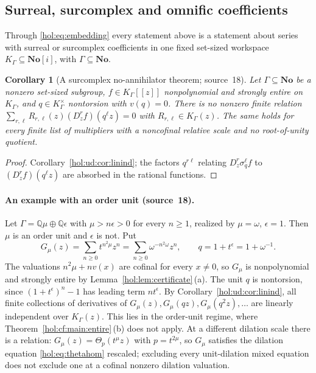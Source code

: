 \documentclass[11pt]{article}
\numberwithin{equation}{section}
\newtheorem{corollary}[theorem]{Corollary}
\theoremstyle{definition}
\theoremstyle{remark}
\newcommand{\Q}{\mathbb Q}
\newcommand{\No}{\mathbf{No}}
\begin{document}
\subsection{Surreal, surcomplex and omnific coefficients}
\label{hol:ud:sub:surreal}

Through \eqref{hol:eq:embedding} every statement above is a statement about
series with surreal or surcomplex coefficients in one fixed set-sized
workspace $K_\Gamma\subseteq\No[i]$, with $\Gamma\subseteq\No$.

\begin{corollary}[A surcomplex no-annihilator theorem; source~18]
\label{hol:ud:cor:surcomplex}
Let $\Gamma\subseteq\No$ be a nonzero set-sized subgroup, $f\in K_\Gamma[[z]]$
nonpolynomial and strongly entire on $K_\Gamma$, and $q\in K_\Gamma^\times$
nontorsion with $v(q)=0$. There is no nonzero finite relation
$\sum_{r,\ell}R_{r,\ell}(z)(D_z^rf)(q^\ell z)=0$ with
$R_{r,\ell}\in K_\Gamma(z)$. The same holds for every finite list of
multipliers with a noncofinal relative scale and no root-of-unity quotient.
\end{corollary}

\begin{proof}
Corollary~\ref{hol:ud:cor:linind}; the factors $q^{r\ell}$ relating
$D_z^r\sigma_q^\ell f$ to $(D_z^rf)(q^\ell z)$ are absorbed in the rational
functions.
\end{proof}

\paragraph{An example with an order unit (source~18).}
Let $\Gamma=\Q\mu\oplus\Q\epsilon$ with $\mu>n\epsilon>0$ for every $n\ge1$,
realized by $\mu=\omega$, $\epsilon=1$. Then $\mu$ is an order unit and
$\epsilon$ is not. Put
\[
 G_\mu(z)=\sum_{n\ge0}t^{n^2\mu}z^n=\sum_{n\ge0}\omega^{-n^2\omega}z^n,\qquad
 q=1+t^\epsilon=1+\omega^{-1}.
\]
The valuations $n^2\mu+nv(x)$ are cofinal for every $x\ne0$, so $G_\mu$ is
nonpolynomial and strongly entire by Lemma~\ref{hol:lem:certificate}\,(a). The
unit $q$ is nontorsion, since $(1+t^\epsilon)^n-1$ has leading term
$nt^\epsilon$. By Corollary~\ref{hol:ud:cor:linind}, all finite collections
of derivatives of $G_\mu(z),G_\mu(qz),G_\mu(q^2z),\ldots$ are linearly
independent over $K_\Gamma(z)$. This lies in the order-unit regime, where
Theorem~\ref{hol:cf:main:entire}\,(b) does not apply. At a different
dilation scale there is a relation: $G_\mu(z)=\Theta_{p}(t^\mu z)$ with
$p=t^{2\mu}$, so $G_\mu$ satisfies the dilation equation \eqref{hol:eq:thetahom}
rescaled; excluding every unit-dilation mixed equation does not exclude one at
a cofinal nonzero dilation valuation.
\end{document}
